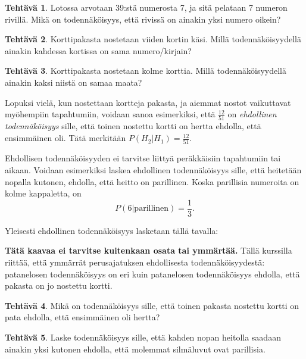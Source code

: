 \documentclass[12pt,leqno,a4paper,oneside]{amsart}
\theoremstyle{definition}
\newtheorem{exercise}{Tehtävä}
\theoremstyle{remark}
\numberwithin{equation}{section}
\begin{document}
\begin{exercise}
 Lotossa arvotaan 39:stä numerosta 7, ja sitä pelataan 7 numeron rivillä. Mikä on todennäköisyys, että rivissä on ainakin yksi numero oikein?
\end{exercise}

\begin{exercise}
 Korttipakasta nostetaan viiden kortin käsi. Millä toden\-näköisyydellä ainakin kahdessa kortissa on sama numero/kirjain?
\end{exercise}

\begin{exercise}
 Korttipakasta nostetaan kolme korttia. Millä toden\-näköisyydellä ainakin kaksi niistä on samaa maata?
\end{exercise}


Lopuksi vielä, kun nostettaan kortteja pakasta, ja aiemmat nostot vaikuttavat myöhempiin tapahtumiin, voidaan sanoa esimerkiksi, että
$\frac{12}{51}$ on \emph{ehdollinen todennäköisyys} sille, että toinen nostettu kortti on hertta ehdolla, että ensimmäinen oli. Tätä merkitään
$P(H_2 | H_1 ) = \frac{12}{51} .$ 

Ehdollisen todennäköisyyden ei tarvitse liittyä peräkkäisiin tapahtumiin tai aikaan. Voidaan esimerkiksi laskea ehdollinen todennäköisyys sille,
että heitetään nopalla kutonen, ehdolla, että heitto on parillinen. Koska parillisia numeroita on kolme kappaletta, on 
$$P(6|\text{parillinen}) = \frac{1}{3}.$$

Yleisesti ehdollinen todennäköisyys lasketaan tällä tavalla:
\begin{center}
\end{center}
\textbf{Tätä kaavaa ei tarvitse kuitenkaan osata tai ymmärtää.} Tällä kurssilla riittää, että ymmärrät perusajatuksen ehdollisesta todennäköisyydestä:
patanelosen todennäköisyys on eri kuin patanelosen todennäköisyys ehdolla, että pakasta on jo nostettu kortti.

\begin{exercise}
 Mikä on todennäköisyys sille, että toinen pakasta nostettu kortti on pata ehdolla, että ensimmäinen oli hertta?
\end{exercise}


\begin{exercise}
 Laske todennäköisyys sille, että kahden nopan heitolla saadaan ainakin yksi kutonen ehdolla, että molemmat silmäluvut ovat parillisia.
\end{exercise}
\end{document}
